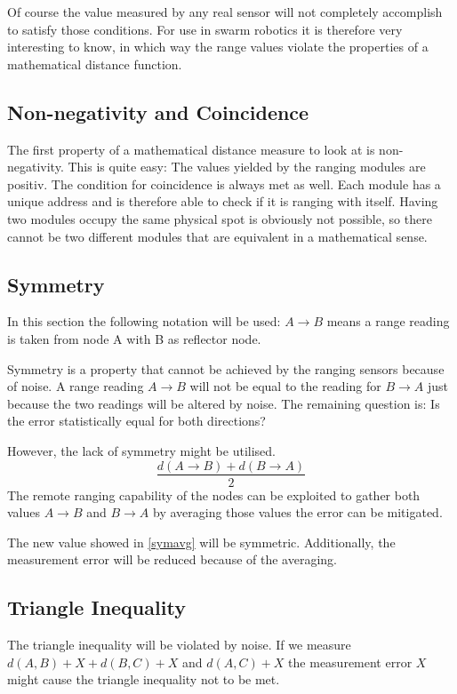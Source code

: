 Of course the value measured by any real sensor will not completely accomplish to satisfy those conditions.
For use in swarm robotics it is therefore very interesting to know, in which way the range values violate the properties of a mathematical distance function.

\subsection{Non-negativity and Coincidence}

The first property of a mathematical distance measure to look at is non-negativity. This is quite easy: The values yielded by the ranging modules are positiv.
The condition for coincidence is always met as well.
Each module has a unique address and is therefore able to check if it is ranging with itself.
Having two modules occupy the same physical spot is obviously not possible, so there cannot be two different modules that are equivalent in a mathematical sense.

\subsection{Symmetry}

In this section the following notation will be used: $A \rightarrow B$ means a range reading is taken from node A with B as reflector node.

Symmetry is a property that cannot be achieved by the ranging sensors because of noise. 
A range reading $A \rightarrow B$ will not be equal to the reading for $B \rightarrow A$ just because the two readings will be altered by noise.
The remaining question is: Is the error statistically equal for both directions?



However, the lack of symmetry might be utilised.
\begin{equation}
\frac{ d(A \rightarrow B) + d(B \rightarrow A) }{2}
\label{symavg}
\end{equation}
The remote ranging capability of the nodes can be exploited to gather both values $A \rightarrow B$ and $B \rightarrow A$ by averaging those values the error can be mitigated.

The new value showed in \autoref{symavg} will be symmetric.
Additionally, the measurement error will be reduced because of the averaging.

\subsection{Triangle Inequality}
The triangle inequality will be violated by noise.
If we measure $d(A,B) + X + d(B,C) + X$ and $d(A, C) + X$ the measurement error $X$ might cause the triangle inequality not to be met.

